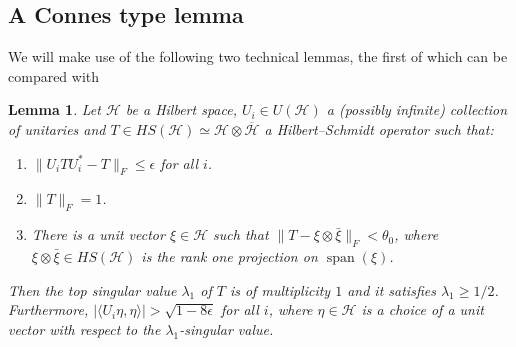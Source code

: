 \documentclass[11pt]{amsart}
\DeclareMathOperator{\spam}{span}
\newcommand{\cH}{{\mathcal{H}}}
\newtheorem{lemma}[theorem]{Lemma}
\theoremstyle{definition}
\theoremstyle{remark}
\theoremstyle{definition}
\newcommand{\admid}[1]{\begingroup\color{orange}Alon: #1\endgroup}
\newcommand{\ad}[1]{\begingroup\color{orange}Alon: #1\endgroup}
\newcommand{\iti}[1]{{\begingroup\color{blue}Itamar: #1\endgroup}}
\begin{document}
\subsection{A Connes type lemma}
We will make use of the following two technical lemmas, the first of which can be compared with \cite[Theorem 1.2.2]{Connes}
   \begin{lemma}
       \label{lem:Connes_trick}
       Let $\cH$ be a Hilbert space, $U_i \in U(\cH)$ a (possibly infinite) collection of unitaries and $T \in HS(\cH) \simeq \cH \otimes \overline{\cH}$ a Hilbert--Schmidt operator such that:
       \begin{enumerate}
           \item $\| U_iTU_i^* - T \|_{F} \leq \epsilon$ for all $i$.
           \item $\| T \|_{F} = 1$.
           \item There is a unit vector $\xi \in \cH$ such that $\| T - \xi \otimes \bar \xi \|_{F} < \theta_0$, where $\xi \otimes \bar \xi \in HS(\cH)$ is the rank one projection on $\spam(\xi)$.
       \end{enumerate}
   Then the top singular value  $\lambda_1$ of  $T$ is of multiplicity $1$ and it satisfies $\lambda_1\geq 1/2$. Furthermore, $|\langle U_i\eta,\eta \rangle| > \sqrt{1- 8\epsilon}$ for all $i$,  where $\eta \in \cH$ is a choice of a unit vector with respect to the $\lambda_1$-singular value. 
   \end{lemma}
\end{document}
